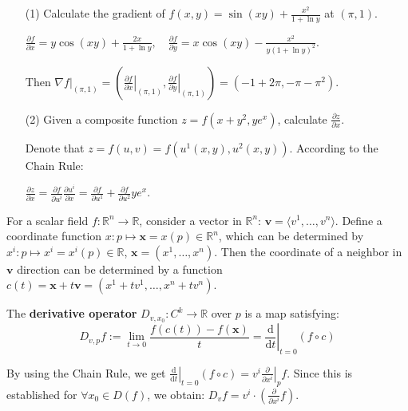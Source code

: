 \begin{example}
	\begin{itemize}
		\item[(1)] Calculate the gradient of $f(x,y)=\sin(xy)+\frac{x^2}{1+\ln y}$ at $(\pi,1)$.
		\begin{solution}
			$\frac{\partial f}{\partial x} = y\cos(xy)+\frac{2x}{1+\ln y},
			\quad \frac{\partial f}{\partial y} = x\cos(xy)-\frac{x^2}{y(1+\ln y)^2}$.

			Then $\nabla f|_{(\pi,1)}=(\left.\frac{\partial f}{\partial x}\right|_{(\pi,1)}, \left.\frac{\partial f}{\partial y}\right|_{(\pi,1)})=
			(-1+2\pi, -\pi-\pi^2)$.
		\end{solution}
		\item[(2)] Given a composite function $z=f(x+y^2, ye^x)$, calculate $\frac{\partial z}{\partial x}$.
		\begin{solution}
			Denote that $z=f(u,v)=f(u^1(x,y),u^2(x,y))$. According to the Chain Rule:
		
			$\frac{\partial z}{\partial x}=\frac{\partial f}{\partial u^i}\frac{\partial u^i}{\partial x}=\frac{\partial f}{\partial u^1}+\frac{\partial f}{\partial u^2}ye^x$.
		\end{solution}
	\end{itemize}
\end{example}

\begin{definition}
	For a scalar field $f: \mathbb{R}^n\to\mathbb{R}$, consider a vector in $\mathbb{R}^n$: $\mathbf{v}=\langle v^1,\dots,v^n\rangle$.
	Define a coordinate function $x: p\mapsto \mathbf{x}=x(p)\in\mathbb{R}^n$, which can be determined by $x^i: p\mapsto x^i=x^i(p)\in\mathbb{R}$, $\mathbf{x}=(x^1,\dots,x^n)$.
	Then the coordinate of a neighbor in $\mathbf{v}$ direction can be determined by a function $c(t)=\mathbf{x}+t\mathbf{v}=(x^1+tv^1,\dots,x^n+tv^n)$.

	The \textbf{derivative operator} $D_{v,x_0}: C^{k}\to\mathbb{R}$ over $p$ is a map satisfying:
	\[
		D_{v,p}f := \lim_{t\to 0}\frac{f(c(t))-f(\mathbf{x})}{t} =
		\left.\frac{\mathrm{d}}{\mathrm{d} t}\right|_{t=0} (f\circ c)
	\]
\end{definition}

By using the Chain Rule, we get $\left.\frac{\mathrm{d}}{\mathrm{d} t}\right|_{t=0} (f\circ c) = v^i \left.\frac{\partial}{\partial x^i}\right|_{p} f$.
Since this is established for $\forall x_0 \in D(f)$, we obtain:
$D_{v}f = v^i \cdot \left(\frac{\partial}{\partial x^i}f\right)$.

